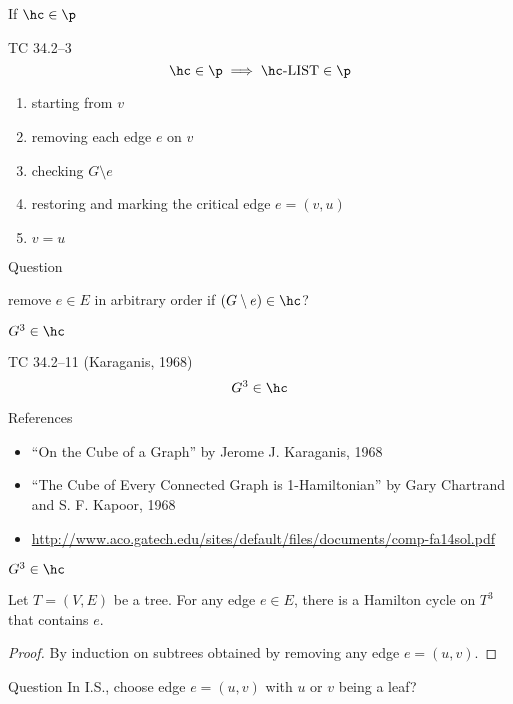 \begin{frame}{If $\hc \in \p$}
  \begin{exampleblock}{TC 34.2--3}
    \[
	  \hc \in \p \implies \hc\text{-LIST} \in \p
	\]
  \end{exampleblock}

  \begin{enumerate}
	\item starting from $v$
	\item removing each edge $e$ on $v$
	\item checking $G \setminus e$
	\item restoring and marking the critical edge $e = (v, u)$
	\item $v = u$
  \end{enumerate}

  \begin{alertblock}{Question}
	\centerline{remove $e \in E$ in arbitrary order if $(G \setminus e) \in \hc$?}
  \end{alertblock}
\end{frame}

\begin{frame}{$G^3 \in \hc$}
  \begin{exampleblock}{TC 34.2--11 (Karaganis, 1968)}
	\[
	  G^3 \in \hc
	\]
  \end{exampleblock}

  \begin{alertblock}{References}
	\begin{itemize}
	  \item ``On the Cube of a Graph'' by Jerome J. Karaganis, 1968
	  \item ``The Cube of Every Connected Graph is 1-Hamiltonian'' by Gary Chartrand and S. F. Kapoor, 1968
	  \item \url{http://www.aco.gatech.edu/sites/default/files/documents/comp-fa14sol.pdf}
	  \end{itemize}
  \end{alertblock}
\end{frame}

\begin{frame}{$G^3 \in \hc$}
  \begin{theorem}[$T^3 \in \hc$]
	Let $T = (V, E)$ be a tree. For any edge $e \in E$, there is a Hamilton cycle on $T^3$ that contains $e$.
  \end{theorem}

  \begin{proof}
	\centerline{By induction on subtrees obtained by removing any edge $e = (u,v)$.}
  \end{proof}

  \begin{alertblock}{Question}
	In I.S., choose edge $e = (u,v)$ with $u$ or $v$ being a leaf?
  \end{alertblock}
\end{frame}

